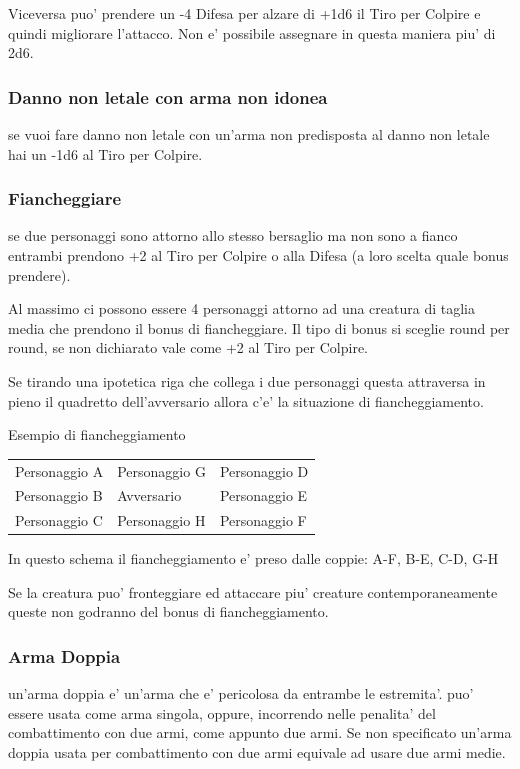 \documentclass[a4paper,11pt,twoside,openany]{book}
\begin{document}
Viceversa puo' prendere un -4 Difesa per alzare di +1d6 il Tiro per Colpire e quindi migliorare l'attacco. Non e' possibile assegnare in questa maniera piu' di 2d6.

\subsubsection{Danno non letale con arma non idonea} se vuoi fare danno non letale con un'arma non predisposta al danno non letale hai un -1d6 al Tiro per Colpire.

\subsubsection{Fiancheggiare} se due personaggi sono attorno allo stesso bersaglio ma non sono a fianco entrambi prendono +2 al Tiro per Colpire o alla Difesa (a loro scelta quale bonus prendere).

Al massimo ci possono essere 4 personaggi attorno ad una creatura di taglia media che prendono il bonus di fiancheggiare. Il tipo di bonus si sceglie round per round, se non dichiarato vale come +2 al Tiro per Colpire.

Se tirando una ipotetica riga che collega i due personaggi questa attraversa in pieno il quadretto dell'avversario allora c'e' la situazione di fiancheggiamento.

\bigskip

Esempio di fiancheggiamento
\medskip
\begin{longtable}{L{3cm} k{3cm} k{3cm}}
\toprule
Personaggio A & Personaggio G & Personaggio D\tabularnewline
Personaggio B & Avversario & Personaggio E\tabularnewline
Personaggio C & Personaggio H & Personaggio F\tabularnewline
\end{longtable}

\bigskip

In questo schema il fiancheggiamento e' preso dalle coppie: A-F, B-E, C-D, G-H

\bigskip

Se la creatura puo' fronteggiare ed attaccare piu' creature contemporaneamente queste non godranno del bonus di fiancheggiamento.

\subsubsection{Arma Doppia} un'arma doppia e' un'arma che e' pericolosa da entrambe le estremita'. puo' essere usata come arma singola, oppure, incorrendo nelle penalita' del combattimento con due armi, come appunto due armi. Se non specificato un'arma doppia usata per combattimento con due armi equivale ad usare due armi medie.
\end{document}
